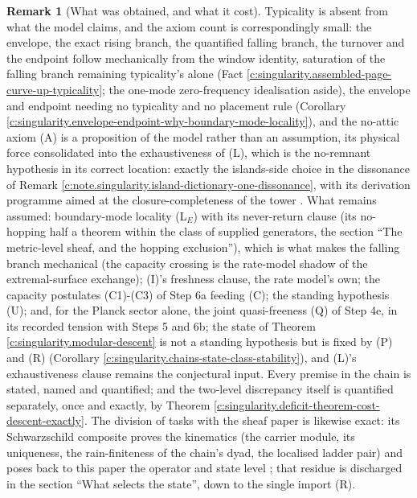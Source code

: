 \documentclass[11pt]{article}
\theoremstyle{definition}
\newtheorem{remark}[theorem]{Remark}
\theoremstyle{plain}
\begin{document}
\begin{remark}[What was obtained, and what it cost]\label{c:note.singularity.what-was-obtained-what-it-cost}
Typicality is absent from what the model claims, and the axiom count is correspondingly small: the envelope, the exact rising branch, the quantified falling branch, the turnover and the endpoint follow mechanically from the window identity, saturation of the falling branch remaining typicality's alone (Fact \ref{c:singularity.assembled-page-curve-up-typicality}; the one-mode zero-frequency idealisation aside), the envelope and endpoint needing no typicality and no placement rule (Corollary \ref{c:singularity.envelope-endpoint-why-boundary-mode-locality}), and the no-attic axiom (A) is a proposition of the model rather than an assumption, its physical force consolidated into the exhaustiveness of (L), which is the no-remnant hypothesis in its correct location: exactly the islands-side choice in the dissonance of Remark \ref{c:note.singularity.island-dictionary-one-dissonance}, with its derivation programme aimed at the closure-completeness of the tower \cite[Cor.~6.2]{ButlerT3}. What remains assumed: boundary-mode locality (L$_E$) with its never-return clause (its no-hopping half a theorem within the class of supplied generators, the section ``The metric-level sheaf, and the hopping exclusion''), which is what makes the falling branch mechanical (the capacity crossing is the rate-model shadow of the extremal-surface exchange); (I)'s freshness clause, the rate model's own; the capacity postulates (C1)-(C3) of Step 6a feeding (C); the standing hypothesis (U); and, for the Planck sector alone, the joint quasi-freeness (Q) of Step 4e, in its recorded tension with Steps 5 and 6b; the state of Theorem \ref{c:singularity.modular-descent} is not a standing hypothesis but is fixed by (P) and (R) (Corollary \ref{c:singularity.chains-state-class-stability}), and (L)'s exhaustiveness clause remains the conjectural input. Every premise in the chain is stated, named and quantified; and the two-level discrepancy itself is quantified separately, once and exactly, by Theorem \ref{c:singularity.deficit-theorem-cost-descent-exactly}. The division of tasks with the sheaf paper is likewise exact: its Schwarzschild composite proves the kinematics (the carrier module, its uniqueness, the rain-finiteness of the chain's dyad, the localised ladder pair) and poses back to this paper the operator and state level \cite[\S 8.9]{ButlerT4}; that residue is discharged in the section ``What selects the state'', down to the single import (R).
\end{remark}
\end{document}
